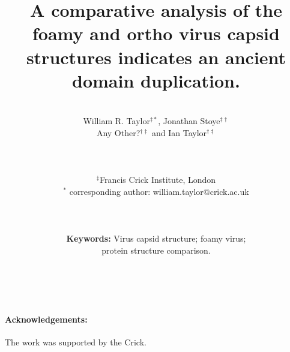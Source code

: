 \documentclass[12pt]{article}
\begin{document}
\title{\bf A comparative analysis of the foamy and ortho virus capsid structures
           indicates an ancient domain duplication.
}

\author{\\William R. Taylor$^{\ddagger*}$,
Jonathan Stoye$^{\ddagger\dagger}$\\
Any Other?$^{\dagger\ddagger}$
and
Ian Taylor$^{\dagger\ddagger}$\\ \\ \\ \\
$^\ddagger$Francis Crick Institute, London\\
$^*$ corresponding author: william.taylor@crick.ac.uk\\ \\ \\ \\
{\bf Keywords:} Virus capsid structure; foamy virus;\\ protein structure comparison.\\ \\ \\
}
\begin{singlespace}
\maketitle
\end{singlespace}
\clearpage

\clearpage

\clearpage

\clearpage

\clearpage

\clearpage
\begin{singlespace}


\paragraph{Acknowledgements:}
The work was supported by the Crick.
%
\end{singlespace}
\end{document}

